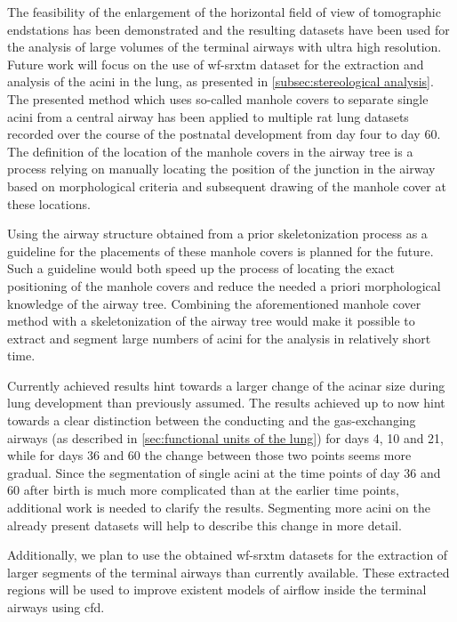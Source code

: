 The feasibility of the enlargement of the horizontal field of view of tomographic endstations has been demonstrated and the resulting datasets have been used for the analysis of large volumes of the terminal airways with ultra high resolution. Future work will focus on the use of \ac{wf-srxtm} dataset for the extraction and analysis of the acini in the lung, as presented in \autoref{subsec:stereological analysis}. The presented method which uses so-called manhole covers to separate single acini from a central airway has been applied to multiple rat lung datasets recorded over the course of the postnatal development from day four to day 60. The definition of the location of the manhole covers in the airway tree is a process relying on manually locating the position of the junction in the airway based on morphological criteria and subsequent drawing of the manhole cover at these locations.

Using the airway structure obtained from a prior skeletonization process as a guideline for the placements of these manhole covers is planned for the future. Such a guideline would both speed up the process of locating the exact positioning of the manhole covers and reduce the needed a priori morphological knowledge of the airway tree. Combining the aforementioned manhole cover method with a skeletonization of the airway tree would make it possible to extract and segment large numbers of acini for the analysis in relatively short time.

Currently achieved results hint towards a larger change of the acinar size during lung development than previously assumed. The results achieved up to now hint towards a clear distinction between the conducting and the gas-exchanging airways (as described in \autoref{sec:functional units of the lung}) for days 4, 10 and 21, while for days 36 and 60 the change between those two points seems more gradual. Since the segmentation of single acini at the time points of day 36 and 60 after birth is much more complicated than at the earlier time points, additional work is needed to clarify the results. Segmenting more acini on the already present datasets will help to describe this change in more detail. 

Additionally, we plan to use the obtained \ac{wf-srxtm} datasets for the extraction of larger segments of the terminal airways than currently available. These extracted regions will be used to improve existent models of airflow inside the terminal airways \cite{Sznitman2007,Sznitman2009} using \ac{cfd}. 

